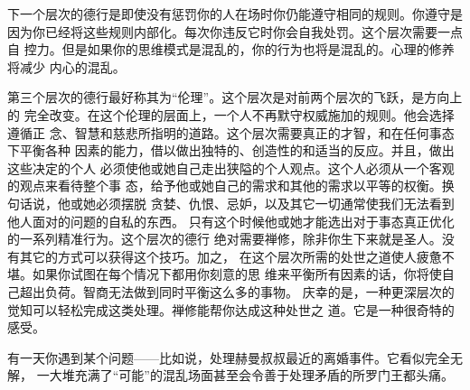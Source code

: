 下一个层次的德行是即使\1没有惩罚你的人在场时你仍能遵守相同的规则。你遵守是
因为你已经将这些规则内部化。每次你违反它时你会自我处罚。这个层次需要一点自
控力。但是如果你的思维模式是混乱的，你的行为也将是混乱的。心理的修养将减少
内心的混乱。

第三个层次的德行最好称其为“伦理”。这个层次是对前两个层次的飞跃，是方向上的
完全改变。在这个伦理的层面上，一个人不再默守权威施加的规则。他会选择遵循正
念、智慧和慈悲所指明的道路。这个层次需要真正的才智，和在任何事态下平衡各种
因素的能力，借以做出独特的、创造性的和适当的反应。并且，做出这些决定的个人
必须使他或她自己走出狭隘的个人观点。这个人必须从一个客观的观点来看待整个事
态，给予他或她自己的需求和其他的需求以平等的权衡。换句话说，他或她必须摆脱
贪婪、仇恨、忌妒，以及其它一切通常使我们无法看到他人面对的问题的自私的东西。
只有这个时候他或她才能选出对于事态真正优化的一系列精准行为。这个层次的德行
绝对需要禅修，除非你生下来就是圣人。没有其它的方式可以获得这个技巧。加之，
在这个层次所需的处世之道使人疲惫不堪。如果你试图在每个情况下都用你刻意的思
维来平衡所有因素的话，你将使自己超出负荷。智商无法做到同时平衡这么多的事物。
庆幸的是，一种更深层次的觉知可以轻松完成这类处理。禅修能帮你达成这种处世之
道。它是一种很奇特的感受。

有一天你遇到某个问题——比如说，处理赫曼叔叔最近的离婚事件。它看似完全无解，
一大堆充满了“可能”的混乱场面\1甚至会令善于处理矛盾的所罗门王都头痛。


\endchapter

\byebye
